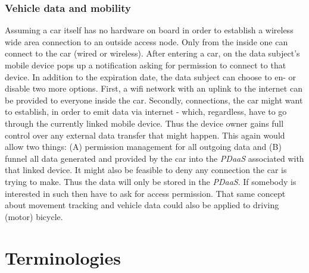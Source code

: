 \documentclass[12pt,english,a4paper,titlepage,cleardoublepage=empty,dottedtoc]{report}
\begin{document}
\subsubsection{Vehicle data and
mobility}\label{vehicle-data-and-mobility}

Assuming a car itself has no hardware on board in order to establish a
wireless wide area connection to an outside access node. Only from the
inside one can connect to the car (wired or wireless). After entering a
car, on the data subject's mobile device pops up a notification asking
for permission to connect to that device. In addition to the expiration
date, the data subject can choose to en- or disable two more options.
First, a wifi network with an uplink to the internet can be provided to
everyone inside the car. Secondly, connections, the car might want to
establish, in order to emit data via internet - which, regardless, have
to go through the currently linked mobile device. Thus the device owner
gains full control over any external data transfer that might happen.
This again would allow two things: (A) permission management for all
outgoing data and (B) funnel all data generated and provided by the car
into the \emph{PDaaS} associated with that linked device. It might also
be feasible to deny any connection the car is trying to make. Thus the
data will only be stored in the \emph{PDaaS}. If somebody is interested
in such then have to ask for access permission. That same concept about
movement tracking and vehicle data could also be applied to driving
(motor) bicycle.

\hypertarget{terminologies}{\section{Terminologies}\label{terminologies}}
\end{document}
